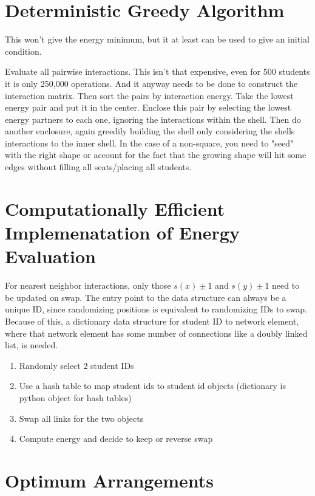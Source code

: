 \documentclass{article}
\begin{document}
\section{Deterministic Greedy Algorithm}
This won't give the energy minimum, but it at least can be used to give an initial condition.

Evaluate all pairwise interactions. This isn't that expensive, even for 500 students it is only 250,000 operations. And it anyway needs to be done to construct the interaction matrix. Then sort the pairs by interaction energy. Take the lowest energy pair and put it in the center. Enclose this pair by selecting the lowest energy partners to each one, ignoring the interactions within the shell. Then do another enclosure, again greedily building the shell only considering the shells interactions to the inner shell. In the case of a non-square, you need to "seed" with the right shape or account for the fact that the growing shape will hit some edges without filling all seats/placing all students. 

\section{Computationally Efficient Implemenatation of Energy Evaluation}

For nearest neighbor interactions, only those $s(x) \pm 1$ and $s(y) \pm 1$ need to be updated on swap. The entry point to the data structure can always be a unique ID, since randomizing positions is equivalent to randomizing IDs to swap. Because of this, a dictionary data structure for student ID to network element, where that network element has some number of connections like a doubly linked list, is needed.

\begin{enumerate}
    \item Randomly select 2 student IDs
    \item Use a hash table to map student ids to student id objects (dictionary is python object for hash tables) 
    \item Swap all links for the two objects
    \item Compute energy and decide to keep or reverse swap
\end{enumerate}

\appendix

\section{Optimum Arrangements}
\end{document}
